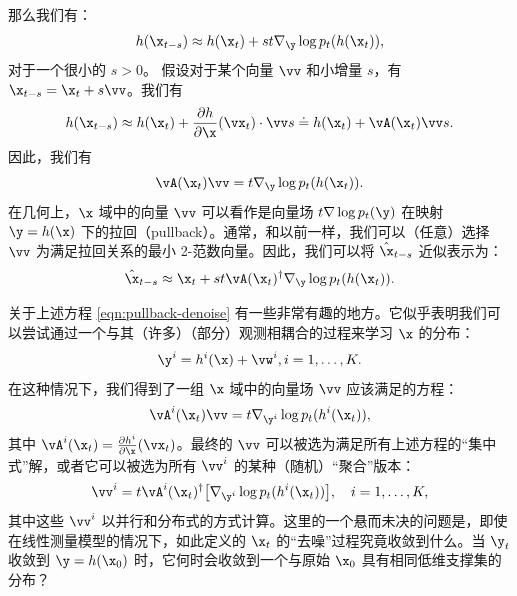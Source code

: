 \documentclass[../../book-main_zh.tex]{subfiles}
\begin{document}
那么我们有：
\begin{equation}
    h(\x_{t-s}) \approx h(\x_t) + st \nabla_{\y} \log p_t(h(\x_t)),
\end{equation}
对于一个很小的 $s >0$。
假设对于某个向量 $\vv$ 和小增量 $s$，有 $\x_{t-s} = \x_t + s \vv$。我们有
\begin{equation}
    h(\x_{t-s}) \approx h(\x_t) + \frac{\partial h}{\partial
    \x}(\vx_{t}) \cdot \vv s \doteq h(\x_t) + \vA(\x_t) \vv s.
\end{equation}
因此，我们有
\begin{equation}
    \vA(\x_t) \vv = t \nabla_{\y} \log p_t(h(\x_t)).
    \label{eqn:pushforward}
\end{equation}
在几何上，$\x$ 域中的向量 $\vv$ 可以看作是向量场 $t \nabla \log p_t(\y)$ 在映射 $\y = h(\x)$ 下的拉回（pullback）。通常，和以前一样，我们可以（任意）选择 $\vv$ 为满足拉回关系的最小 2-范数向量。因此，我们可以将 $\hat{\x}_{t-s}$ 近似表示为：
\begin{equation}
    \hat{\x}_{t-s} \approx \x_t + st\vA(\x_t)^\dagger \nabla_{\y}
    \log p_t(h(\x_t)).
    \label{eqn:pullback-denoise}
\end{equation}

\begin{remark}[并行传感与分布式去噪。]
    {关于上述方程 \eqref{eqn:pullback-denoise} 有一些非常有趣的地方。它似乎表明我们可以尝试通过一个与其（许多）（部分）观测相耦合的过程来学习 $\x$ 的分布：
        \begin{equation}
            \y^i = h^i(\x) +\vw^i, i =1, \ldots, K.
        \end{equation} 在这种情况下，我们得到了一组 $\x$ 域中的向量场 $\vv$ 应该满足的方程：
        \begin{equation}
            \vA^i(\x_t) \vv = t \nabla_{\y^i} \log p_t(h^i(\x_t)),
            \label{eqn:federated-pushforward}
        \end{equation}
        其中 $\vA^i(\x_t) = \frac{\partial h^i}{\partial
        \x}(\vx_t)$。最终的 $\vv$ 可以被选为满足所有上述方程的“集中式”解，或者它可以被选为所有 $\vv^i$ 的某种（随机）“聚合”版本：
        \begin{equation}
            \vv^i = t\vA^i(\x_t)^\dagger \big[\nabla_{\y^i} \log
            p_t(h^i(\x_t))\big], \quad i = 1, \ldots, K,
        \end{equation}
        其中这些 $\vv^i$ 以并行和分布式的方式计算。这里的一个悬而未决的问题是，即使在线性测量模型的情况下，如此定义的 $\x_t$ 的“去噪”过程究竟收敛到什么。当 $\y_t$ 收敛到 $\y = h(\x_0)$ 时，它何时会收敛到一个与原始 $\x_0$ 具有相同低维支撑集的分布？ }
\end{remark}
\end{document}
